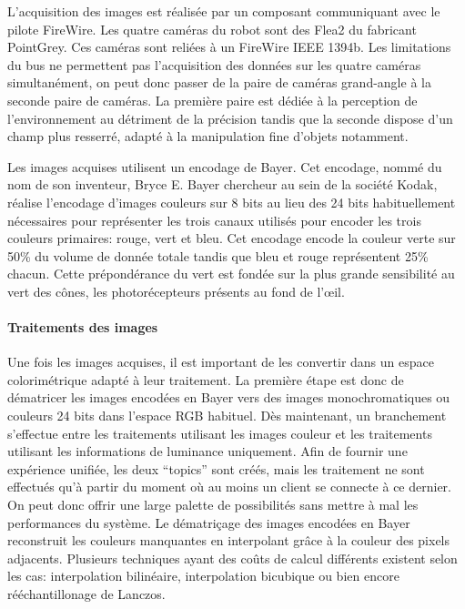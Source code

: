 L'acquisition des images est réalisée par un composant communiquant
avec le pilote FireWire. Les quatre caméras du robot sont des Flea2 du
fabricant PointGrey. Ces caméras sont reliées à un FireWire IEEE
1394b. Les limitations du bus ne permettent
pas l'acquisition des données sur les quatre caméras simultanément, on
peut donc passer de la paire de caméras grand-angle à la seconde paire
de caméras. La première paire est dédiée à la perception de
l'environnement au détriment de la précision tandis que la seconde
dispose d'un champ plus resserré, adapté à la manipulation fine
d'objets notamment.

Les images acquises utilisent un encodage de Bayer. Cet encodage, nommé du nom de son inventeur, Bryce
E. Bayer chercheur au sein de la société Kodak, réalise l'encodage
d'images couleurs sur 8 bits au lieu des 24 bits habituellement
nécessaires pour représenter les trois canaux utilisés pour encoder
les trois couleurs primaires: rouge, vert et bleu. Cet encodage encode
la couleur verte sur 50\% du volume de donnée totale tandis que bleu
et rouge représentent 25\% chacun. Cette prépondérance du vert est
fondée sur la plus grande sensibilité au vert des cônes, les
photorécepteurs présents au fond de l'\oe il.


\paragraph{Traitements des images}

Une fois les images acquises, il est important de les convertir dans
un espace colorimétrique adapté à leur
traitement. La première étape est donc de dématricer les images
encodées en Bayer vers des images monochromatiques ou couleurs 24 bits
dans l'espace RGB habituel. Dès maintenant, un branchement s'effectue
entre les traitements utilisant les images couleur et les traitements
utilisant les informations de luminance uniquement. Afin de fournir
une expérience unifiée, les deux ``topics'' sont créés, mais les
traitement ne sont effectués qu'à partir du moment où au moins un
client se connecte à ce dernier. On peut donc offrir une large palette
de possibilités sans mettre à mal les performances du système. Le
dématriçage des images encodées en Bayer
reconstruit les couleurs manquantes en interpolant grâce à la couleur
des pixels adjacents. Plusieurs techniques ayant des coûts de calcul
différents existent selon les cas: interpolation bilinéaire,
interpolation bicubique ou bien encore rééchantillonage de
Lanczos.


